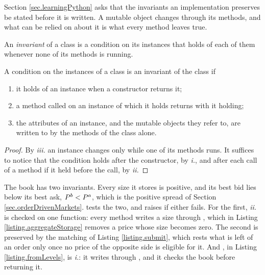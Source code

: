 Section \ref{sec.learningPython} asks that the invariants an implementation preserves
be stated before it is written.
A mutable object changes through its methods,
and what can be relied on about it is what every method leaves true.

\begin{defi}\label{def.classInvariant}
 An \emph{invariant} of a class is a condition on its instances
 that holds of each of them whenever none of its methods is running.
\end{defi}

\begin{prop}\label{prop.invariantByInduction}
 A condition on the instances of a class is an invariant of the class if
 \begin{enumerate}[label={\emph{\roman{*}}.}]
  \item it holds of an instance when a constructor returns it;
  \item a method called on an instance of which it holds returns with it holding;
  \item the attributes of an instance, and the mutable objects they refer to,
        are written to by the methods of the class alone.
 \end{enumerate}
\end{prop}
\begin{proof}
 By \emph{iii.} an instance changes only while one of its methods runs.
 It suffices to notice that the condition holds after the constructor, by \emph{i.},
 and after each call of a method if it held before the call, by \emph{ii.}
\end{proof}

The book has two invariants.
Every size it stores is positive,
and its best bid lies below its best ask, $P^{b} < P^{a}$,
which is the positive spread of Section \ref{sec.orderDrivenMarkets}.
 tests the two, and raises if either fails.
For the first, \emph{ii.} is checked on one function:
every method writes a size through ,
which in Listing \ref{listing.aggregateStorage} removes a price whose size becomes zero.
The second is preserved by the matching of Listing \ref{listing.submit},
which rests what is left of an order only once no price of the opposite side is eligible for it.
And , in Listing \ref{listing.fromLevels}, is \emph{i.}:
it writes through , and it checks the book before returning it.

